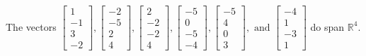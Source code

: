 \begin{exercise}
\begin{exerciseStatement}
  \end{exerciseStatement}
  \begin{exerciseAnswer}
   The vectors \(\left[\begin{array}{r}
1 \\
-1 \\
3 \\
-2
\end{array}\right] , \left[\begin{array}{r}
-2 \\
-5 \\
2 \\
4
\end{array}\right] , \left[\begin{array}{r}
2 \\
-2 \\
-2 \\
4
\end{array}\right] , \left[\begin{array}{r}
-5 \\
0 \\
-5 \\
-4
\end{array}\right] , \left[\begin{array}{r}
-5 \\
4 \\
0 \\
3
\end{array}\right] , \text{ and } \left[\begin{array}{r}
-4 \\
1 \\
-3 \\
1
\end{array}\right]\) 
  	 do  
	span \(\mathbb{R}^4\).
  


  \end{exerciseAnswer}
\end{exercise}